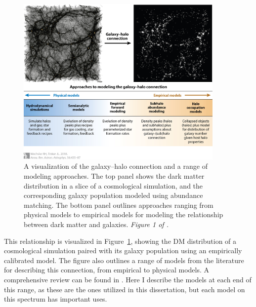 \begin{figure}
    \centering
    \includegraphics[width=0.9\textwidth]{galhalo.jpg}
    \caption{A visualization of the galaxy--halo connection and a range of modeling approaches. The top panel shows the dark matter distribution in a slice of a cosmological simulation, and the corresponding galaxy population modeled using abundance matching. The bottom panel outlines approaches ranging from physical models to empirical models for modeling the relationship between dark matter and galaxies. \emph{Figure 1 of \cite{wechsler_connection_2018}.}}
    \label{fig:galhalo}
\end{figure}

This relationship is visualized in Figure~\ref{fig:galhalo}, showing the DM distribution of a cosmological simulation paired with its galaxy population using an empirically calibrated model.
The figure also outlines a range of models from the literature for describing this connection, from empirical to physical models.
A comprehensive review can be found in \cite{WechslerTinker2018}.
Here I describe the models at each end of this range, as these are the ones utilized in this dissertation, but each model on this spectrum has important uses.

